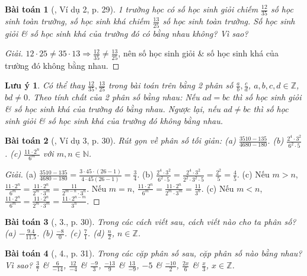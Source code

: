 \documentclass{article}
\newtheorem{baitoan}{Bài toán}
\newtheorem{luuy}{Lưu ý}
\begin{document}
\begin{baitoan}[\cite{SBT_Toan_6_Canh_Dieu_tap_2}, Ví dụ 2, p. 29]
	1 trường học có số học sinh giỏi chiếm $\frac{12}{35}$ số học sinh toàn trường, số học sinh khá chiếm $\frac{13}{25}$ số học sinh toàn trường. Số học sinh giỏi \& số học sinh khá của trường đó có bằng nhau không? Vì sao?
\end{baitoan}

\begin{proof}[Giải]
	$12\cdot25\ne35\cdot13\Rightarrow\frac{12}{35}\ne\frac{13}{25}$, nên số học sinh giỏi \& số học sinh khá của trường đó không bằng nhau.
\end{proof}

\begin{luuy}
	Có thể thay $\frac{12}{35},\frac{13}{25}$ trong bài toán trên bằng 2 phân số $\frac{a}{b},\frac{c}{d}$, $a,b,c,d\in\mathbb{Z}$, $bd\ne0$. Theo tính chất của 2 phân số bằng nhau: Nếu $ad = bc$ thì số học sinh giỏi \& số học sinh khá của trường đó bằng nhau. Ngược lại, nếu $ad\ne bc$ thì số học sinh giỏi \& số học sinh khá của trường đó không bằng nhau.
\end{luuy}

\begin{baitoan}[\cite{SBT_Toan_6_Canh_Dieu_tap_2}, Ví dụ 3, p. 30]
	Rút gọn về phân số tối giản: (a) $\frac{3510 - 135}{4680 - 180}$. (b) $\frac{2^4\cdot3^2}{6^2\cdot5}$. (c) $\frac{11\cdot2^n}{6^m}$ với $m,n\in\mathbb{N}$.
\end{baitoan}

\begin{proof}[Giải]
	(a) $\frac{3510 - 135}{4680 - 180} = \frac{3\cdot45\cdot(26 - 1)}{4\cdot45(26 - 1)} = \frac{3}{4}$. (b) $\frac{2^4\cdot3^2}{6^2\cdot5} = \frac{2^4\cdot3^2}{2^2\cdot3^2\cdot5} = \frac{2^2}{5} = \frac{4}{5}$. (c) Nếu $m > n$, $\frac{11\cdot2^n}{6^m} = \frac{11\cdot2^n}{2^m\cdot3^m} = \frac{11}{2^{m-n}\cdot3^n}$. Nếu $m = n$, $\frac{11\cdot2^n}{6^m} = \frac{11\cdot2^n}{2^m\cdot3^m} = \frac{11}{3^n}$. (c) Nếu $m < n$, $\frac{11\cdot2^n}{6^m} = \frac{11\cdot2^n}{2^m\cdot3^m} = \frac{11\cdot2^{n-m}}{3^n}$.
\end{proof}

\begin{baitoan}[\cite{SBT_Toan_6_Canh_Dieu_tap_2}, 3., p. 30]
	Trong các cách viết sau, cách viết nào cho ta phân số? (a) $-\frac{9.4}{11.5}$. (b) $\frac{-8}{0}$. (c) $\frac{7}{1}$. (d) $\frac{n}{2}$, $n\in\mathbb{Z}$.
\end{baitoan}

\begin{baitoan}[\cite{SBT_Toan_6_Canh_Dieu_tap_2}, 4., p. 31]
	Trong các cặp phân số sau, cặp phân số nào bằng nhau? Vì sao? $\frac{3}{7}$ \& $\frac{6}{-14}$, $\frac{12}{-4}$ \& $\frac{-9}{3}$, $\frac{-13}{9}$ \& $\frac{13}{-9}$, $-5$ \& $\frac{-10}{2}$, $\frac{2x}{6}$ \& $\frac{x}{3}$, $x\in\mathbb{Z}$.
\end{baitoan}
\end{document}
